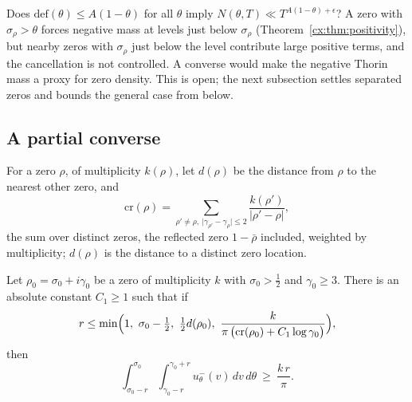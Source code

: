 \begin{problem}[converse]\label{cf:op:converse}
Does $\mathrm{def}(\theta)\le A(1-\theta)$ for all $\theta$ imply $N(\theta,T)\ll T^{A(1-\theta)+\epsilon}$? A zero with $\sigma_\rho>\theta$ forces negative mass at levels just below $\sigma_\rho$ (Theorem~\ref{cx:thm:positivity}), but nearby zeros with $\sigma_\rho$ just below the level contribute large positive terms, and the cancellation is not controlled. A converse would make the negative Thorin mass a proxy for zero density. This is open; the next subsection settles separated zeros and bounds the general case from below.
\end{problem}

\subsection{A partial converse}

For a zero $\rho$, of multiplicity $k(\rho)$, let $d(\rho)$ be the distance from $\rho$ to the nearest other zero, and
\[
\mathrm{cr}(\rho)=\sum_{\rho'\ne\rho,\ \lvert\gamma_{\rho'}-\gamma_\rho\rvert\le2}\frac{k(\rho')}{\lvert\rho'-\rho\rvert},
\]
the sum over distinct zeros, the reflected zero $1-\bar\rho$ included, weighted by multiplicity; $d(\rho)$ is the distance to a distinct zero location.

\begin{proposition}\label{cf:prop:converse}
Let $\rho_0=\sigma_0+i\gamma_0$ be a zero of multiplicity $k$ with $\sigma_0>\frac12$ and $\gamma_0\ge3$. There is an absolute constant $C_1\ge1$ such that if
\[
r\le\min\Bigl(1,\ \sigma_0-\tfrac12,\ \tfrac12d(\rho_0),\ \frac k{\pi\,\bigl(\mathrm{cr}(\rho_0)+C_1\log\gamma_0\bigr)}\Bigr),
\]
then
\[
\int_{\sigma_0-r}^{\sigma_0}\int_{\gamma_0-r}^{\gamma_0+r}u_\theta^-(v)\,dv\,d\theta\ \ge\ \frac{k\,r}{\pi}.
\]
\end{proposition}

